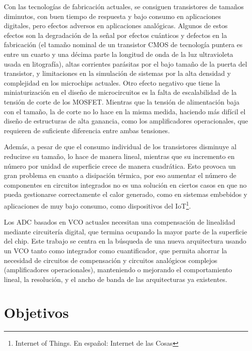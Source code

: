 \documentclass[12pt]{report} %
\begin{document}
	Con las tecnologías de fabricación actuales, se consiguen transistores de tamaños diminutos, con buen tiempo de respuesta y bajo consumo en aplicaciones digitales, pero efectos adversos en aplicaciones analógicas.
	Algunos de estos efectos son la degradación de la señal por efectos cuánticos y defectos en la fabricación (el tamaño nominal de un transistor CMOS de tecnología puntera es entre un cuarto y una décima parte la longitud de onda de la luz ultravioleta usada en litografía), altas corrientes parásitas por el bajo tamaño de la puerta del transistor, y limitaciones en la simulación de sistemas por la alta densidad y complejidad en los microchips actuales. Otro efecto negativo que tiene la miniaturización en el diseño de microcircuitos es la falta de escalabilidad de la tensión de corte de los MOSFET. Mientras que la tensión de alimentación baja con el tamaño, la de corte no lo hace en la misma medida, haciendo más difícil el diseño de estructuras de alta ganancia, como los amplificadores operacionales, que requieren de suficiente diferencia entre ambas tensiones.
	
	Además, a pesar de que el consumo individual de los transistores disminuye al reducirse su tamaño, lo hace de manera lineal, mientras que su incremento en número por unidad de superficie crece de manera cuadrática. Esto provoca un gran problema en cuanto a disipación térmica, por eso aumentar el número de componentes en circuitos integrados no es una solución en ciertos casos en que no pueda gestionarse correctamente el calor generado, como en sistemas embebidos y aplicaciones de muy bajo consumo, como dispositivos del IoT\footnote{Internet of Things. En español: Internet de las Cosas}.
	
	Los ADC basados en VCO actuales necesitan una compensación de linealidad mediante circuitería digital, que termina ocupando la mayor parte de la superficie del chip. Este trabajo se centra en la búsqueda de una nueva arquitectura usando un VCO tanto como integrador como cuantificador, que permita ahorrar la necesidad de circuitos de compensación y circuitos analógicos complejos (amplificadores operacionales), manteniendo o mejorando el comportamiento lineal, la resolución, y el ancho de banda de las arquitecturas ya existentes.
	
	\section{Objetivos}
	
\end{document}

